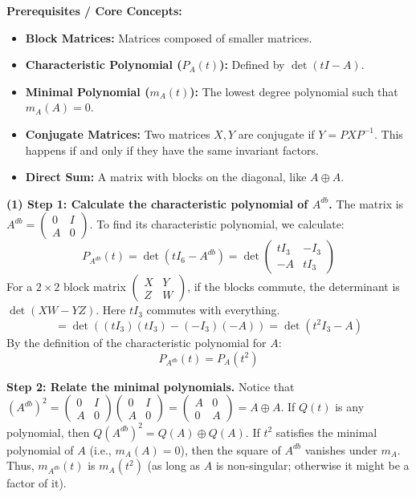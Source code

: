 \begin{solution}
\textbf{Prerequisites / Core Concepts:}
\begin{itemize}
    \item \textbf{Block Matrices:} Matrices composed of smaller matrices.
    \item \textbf{Characteristic Polynomial ($P_A(t)$):} Defined by $\det(tI - A)$.
    \item \textbf{Minimal Polynomial ($m_A(t)$):} The lowest degree polynomial such that $m_A(A) = 0$.
    \item \textbf{Conjugate Matrices:} Two matrices $X, Y$ are conjugate if $Y = PXP^{-1}$. This happens if and only if they have the same invariant factors.
    \item \textbf{Direct Sum:} A matrix with blocks on the diagonal, like $A \oplus A$.
\end{itemize}

\textbf{(1) Step 1: Calculate the characteristic polynomial of $A^{db}$.}
The matrix is $A^{db} = \begin{pmatrix} 0 & I \\ A & 0 \end{pmatrix}$. To find its characteristic polynomial, we calculate:
\[ P_{A^{db}}(t) = \det(tI_{6} - A^{db}) = \det \begin{pmatrix} tI_3 & -I_3 \\ -A & tI_3 \end{pmatrix} \]
For a $2 \times 2$ block matrix $\begin{pmatrix} X & Y \\ Z & W \end{pmatrix}$, if the blocks commute, the determinant is $\det(XW - YZ)$. Here $tI_3$ commutes with everything.
\[ = \det( (tI_3)(tI_3) - (-I_3)(-A) ) = \det( t^2 I_3 - A ) \]
By the definition of the characteristic polynomial for $A$:
\[ P_{A^{db}}(t) = P_A(t^2) \]

\textbf{Step 2: Relate the minimal polynomials.}
Notice that $(A^{db})^2 = \begin{pmatrix} 0 & I \\ A & 0 \end{pmatrix} \begin{pmatrix} 0 & I \\ A & 0 \end{pmatrix} = \begin{pmatrix} A & 0 \\ 0 & A \end{pmatrix} = A \oplus A$.
If $Q(t)$ is any polynomial, then $Q(A^{db})^2 = Q(A) \oplus Q(A)$.
If $t^2$ satisfies the minimal polynomial of $A$ (i.e., $m_A(A) = 0$), then the square of $A^{db}$ vanishes under $m_A$.
Thus, $m_{A^{db}}(t)$ is $m_A(t^2)$ (as long as $A$ is non-singular; otherwise it might be a factor of it).


\end{solution}
